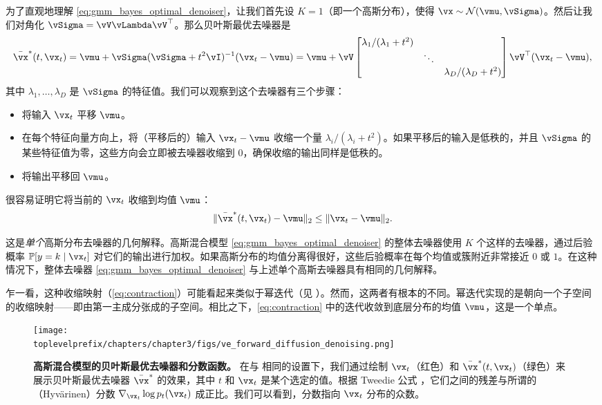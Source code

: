 \documentclass[../../book-main_zh.tex]{subfiles}
\begin{document}
\begin{example}[从高斯混合模型中去噪高斯噪声]
	为了直观地理解 \eqref{eq:gmm_bayes_optimal_denoiser}，让我们首先设 \(K = 1\)（即一个高斯分布），使得 \(\vx \sim \dNorm(\vmu, \vSigma)\)。然后让我们对角化 \(\vSigma = \vV\vLambda \vV^{\top}\)。那么贝叶斯最优去噪器是
	\begin{equation}
		\bar{\vx}^{\ast}(t, \vx_{t}) = \vmu + \vSigma(\vSigma + t^{2}\vI)^{-1}(\vx_{t} - \vmu) = \vmu + \vV\mat{\lambda_{1}/(\lambda_{1} + t^{2}) & & \\ & \ddots & \\ & & \lambda_{D}/(\lambda_{D} + t^{2})}\vV^{\top}(\vx_{t} - \vmu),
	\end{equation}
	其中 \(\lambda_{1}, \dots, \lambda_{D}\) 是 \(\vSigma\) 的特征值。我们可以观察到这个去噪器有三个步骤：
	\begin{itemize}
		\item 将输入 \(\vx_{t}\) 平移 \(\vmu\)。
		\item 在每个特征向量方向上，将（平移后的）输入 \(\vx_{t} - \vmu\) 收缩一个量 \(\lambda_{i}/(\lambda_{i} + t^{2})\)。如果平移后的输入是低秩的，并且 \(\vSigma\) 的某些特征值为零，这些方向会立即被去噪器收缩到 \(0\)，确保收缩的输出同样是低秩的。
		\item 将输出平移回 \(\vmu\)。
	\end{itemize}
	很容易证明它将当前的 \(\vx_{t}\) 收缩到均值 \(\vmu\)：
	\begin{equation}\label{eq:contraction}
		\norm{\bar{\vx}^{\ast}(t, \vx_{t}) - \vmu}_{2} \leq \norm{\vx_{t} - \vmu}_{2}.
	\end{equation}

	这是\textit{单个}高斯分布去噪器的几何解释。高斯混合模型 \eqref{eq:gmm_bayes_optimal_denoiser} 的整体去噪器使用 \(K\) 个这样的去噪器，通过后验概率 \(\Pr[y = k \mid \vx_{t}]\) 对它们的输出进行加权。如果高斯分布的均值分离得很好，这些后验概率在每个均值或簇附近非常接近 \(0\) 或 \(1\)。在这种情况下，整体去噪器 \eqref{eq:gmm_bayes_optimal_denoiser} 与上述单个高斯去噪器具有相同的几何解释。

    乍一看，这种收缩映射（\eqref{eq:contraction}）可能看起来类似于幂迭代（见 ）。然而，这两者有根本的不同。幂迭代实现的是朝向一个子空间的收缩映射——即由第一主成分张成的子空间。相比之下，\eqref{eq:contraction} 中的迭代收敛到底层分布的均值 \(\vmu\)，这是一个单点。
\end{example}

\begin{figure}
	\centering 
	\texttt{[image: \\toplevelprefix/chapters/chapter3/figs/ve\_forward\_diffusion\_denoising.png]}\vspace{-0.15in}
	\caption{\small \textbf{高斯混合模型的贝叶斯最优去噪器和分数函数。} 在与  相同的设置下，我们通过绘制 \(\vx_{t}\)（红色）和 \(\bar{\vx}^{\ast}(t, \vx_{t})\)（绿色）来展示贝叶斯最优去噪器 \(\bar{\vx}^{\ast}\) 的效果，其中 \(t\) 和 \(\vx_{t}\) 是某个选定的值。根据 Tweedie 公式 ，它们之间的残差与所谓的（Hyv\"arinen）分数 \(\nabla_{\vx_{t}}\log p_{t}(\vx_{t})\) 成正比。我们可以看到，分数指向 \(\vx_{t}\) 分布的众数。}
	\label{fig:ve_forward_denoising}
\end{figure}
\end{document}
